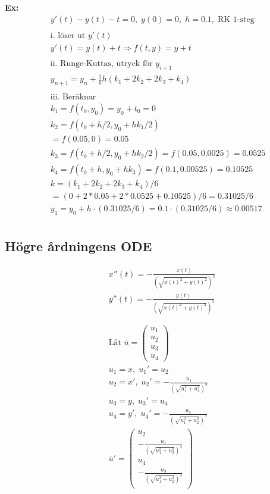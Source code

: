 \begin{multicols}{2}
\textbf{Ex:}
\begin{align*}
    &y'(t)-y(t)-t=0, \; y(0)=0, \; h=0.1, \; \text{RK 1-steg} \\
    &\\
    &\text{i. löser ut } y'(t) \\
    &y'(t)=y(t)+t \Rightarrow f(t,y) = y+t \\
    &\\
    &\text{ii. Runge-Kuttas, utryck för } y_{i+1} \\
    &y_{n+1} = y_n+\frac{1}{6}h(k_1+2k_2+2k_3+k_4) \\
    &\\
    &\text{iii. Beräknar } \\
    &k_1 = f(t_0,y_0) = y_0 + t_0 = 0 \\
    &k_2 = f(t_0+h/2,y_0+hk_1/2) \\ 
    &= f(0.05,0) = 0.05 \\
    &k_3 = f(t_0+h/2,y_0+hk_2/2) = f(0.05,0.0025) = 0.0525 \\
    &k_4 = f(t_0+h,y_0+hk_3) = f(0.1,0.00525) = 0.10525 \\
    &k = (k_1+2k_2+2k_3+k_4)/6 \\
    &= (0+2*0.05+2*0.0525+0.10525)/6=0.31025/6 \\
    &y_1 = y_0 + h\cdot(0.31025/6) = 0.1\cdot(0.31025/6) \approx 0.00517 \\
\end{align*}

\newpage
\subsection{Högre årdningens ODE}
\begin{align*}
  &\quad  x''(t) = -\frac{x(t)}{(\sqrt{x(t)^2+y(t)^2})^3} \\
  &\quad  y''(t) = -\frac{y(t)}{(\sqrt{x(t)^2+y(t)^2})^3} \\
  &\quad  \\
  &\quad  \\
  &\quad  \text{Låt } \overline{u} =  \begin{pmatrix} u_1 \\ u_2 \\ u_3 \\ u_4 \end{pmatrix} \\
  &\quad  u_1 = x,  \; u_1' = u_2 \\
  &\quad  u_2 = x', \; u_2' = -\frac{u_1}{(\sqrt{u_1^2+u_2^2})^3} \\
  &\quad  u_3 = y,  \; u_3' = u_4 \\
  &\quad  u_4 = y', \; u_4' = -\frac{u_3}{(\sqrt{u_1^2+u_2^2})^3} \\
  &\quad  \overline{u}' =
  \begin{pmatrix}
      u_2 \\
      -\frac{u_1}{(\sqrt{u_1^2+u_2^2})^3} \\
      u_4 \\
      -\frac{u_3}{(\sqrt{u_1^2+u_2^2})^3} \\
  \end{pmatrix} \\
\end{align*}


\end{multicols}
